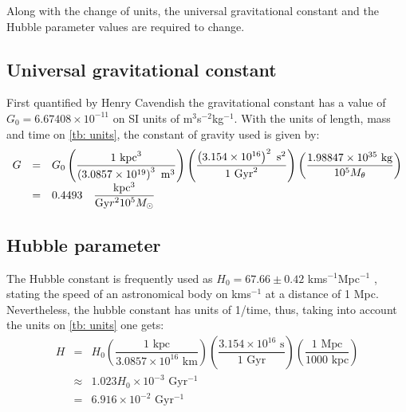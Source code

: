 	Along with the change of units, the universal gravitational constant and the Hubble parameter values are required to change.
	
	\subsection{Universal gravitational constant}
	First quantified by Henry Cavendish the gravitational constant has a value of $G_0 = 6.67408\times10^{-11}$ on SI units of m$^3$s$^{-2}$kg$^{-1}$. With the units of length, mass and time on \autoref{tb: units}, the constant of gravity used is given by:
	\begin{equation}
	\begin{array}{ccl}
	G & = & G_0 \left(\dfrac{1 \text{ kpc}^3}{\left(3.0857\times10^{19}\right)^3  \text{ m}^3}\right)\left(\dfrac{\left(3.154\times10^{16}\right)^2 \text{ s}^2}{1 \text{ Gyr}^2}\right)\left(\dfrac{1.98847\times10^{35} \text{ kg}}{10^5 M_\theta}\right) \\
	& = & 0.4493 \quad \dfrac{\text{kpc$^3$}}{\text{Gy$r^210^5$$M_\odot$}}	
	\end{array}
	\end{equation}
	
	
	\subsection{Hubble parameter}
	The Hubble constant is frequently used as $H_0 = 67.66 \pm 0.42$ kms$^{-1}$Mpc$^{-1}$ \cite{aghanim2018planck}, stating the speed of an astronomical body on kms$^{-1}$ at a distance of 1 Mpc. Nevertheless, the hubble constant has units of 1/time, thus, taking into account the units on \autoref{tb: units} one gets:
	\begin{equation}
	\begin{array}{ccl}
	H & = & H_0 \left(\dfrac{1 \text{ kpc}}{3.0857\times10^{16} \text{ km}}\right)\left(\dfrac{3.154\times10^{16} \text{ s}}{1 \text{ Gyr}}\right)\left(\dfrac{1 \text{ Mpc}}{1000 \text{ kpc}}\right) \\
	& \approx & 1.023 H_0 \times10^{-3} \text{ Gyr$^{-1}$} \\ 
	& = & 6.916\times10^{-2}\text{ Gyr$^{-1}$}
	\end{array}
	\end{equation}
	
